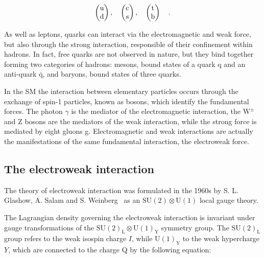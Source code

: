 \begin{equation}
\label{eq:quarks}
\begin{pmatrix} \rm u       \\ \rm d      \end{pmatrix}, \quad
\begin{pmatrix} \rm c       \\ \rm s      \end{pmatrix}, \quad
\begin{pmatrix} \rm t       \\ \rm b      \end{pmatrix}  \quad .
\end{equation}

As well as leptons, quarks can interact via the electromagnetic and weak force, but also through the strong interaction, responsible of their confinement within hadrons. In fact, free quarks are not observed in nature, but they bind together forming two categories of hadrons: mesons, bound states of a quark q and an anti-quark $\mathrm{\bar{q}}$, and baryons, bound states of three quarks.

In the SM the interaction between elementary particles occurs through the exchange of spin-1 particles, known as bosons, which identify the fundamental forces. The photon $\gamma$ is the mediator of the electromagnetic interaction, the $\mathrm{W^{\pm}}$ and Z bosons are the mediators of the weak interaction, while the strong force is mediated by eight gluons g. Electromagnetic and weak interactions are actually the manifestations of the same fundamental interaction, the electroweak force.


\subsection{The electroweak interaction}

The theory of electroweak interaction was formulated in the 1960s by S. L. Glashow, A. Salam and S. Weinberg~\cite{Glashow:1961tr,Weinberg:1967tq} as an $\mathrm{SU(2) \otimes U(1)}$ local gauge theory.

The Lagrangian density governing the electroweak interaction is invariant under gauge transformations of the $\mathrm{SU(2)_L\otimes U(1)_Y}$ symmetry group. The $\mathrm{SU(2)_L}$ group refers to the weak isospin charge $I$, while $\mathrm{U(1)_Y}$ to the weak hypercharge $Y$, which are connected to the charge Q by the following equation:

